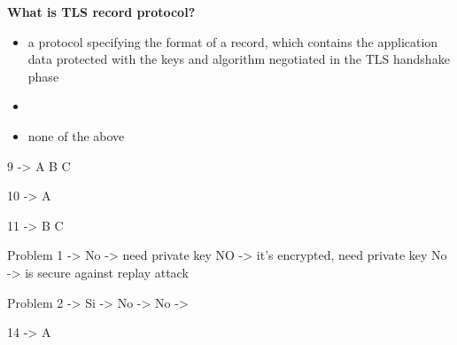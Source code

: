 \textbf{What is TLS record protocol?}
\begin{itemize}
	\item[A.] a protocol specifying the format of a record, which contains the application data protected with the keys and algorithm negotiated in the TLS handshake phase
	\item[B.] 
	\item[C.] none of the above
\end{itemize}
\com{}

9 -> A B C

10 -> A

11 -> B C

Problem 1 ->  {
No -> need private key
NO -> it's encrypted, need private key
No -> is secure against replay attack
}

Problem 2 -> {
Si ->
No ->
No ->
}

14 -> A